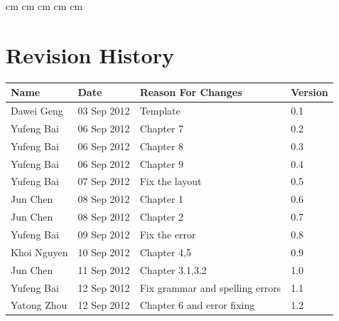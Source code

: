 \documentclass[11pt, a4paper]{report}
\begin{document}
 cm
 cm
 cm
 cm
 cm

\tableofcontents






\clearpage
\section*{Revision History}
\begin{tabular}{| l | l | l | l | }
\hline
Name				&	Date        	&	Reason For Changes                  	  	&	Version     	\\ \hline
Dawei Geng			&	03 Sep 2012     &	Template			                    	&	0.1 	    	\\ \hline
Yufeng Bai			&	06 Sep 2012	&	Chapter 7							&	0.2		\\ \hline
Yufeng Bai			&	06 Sep 2012	&	Chapter 8							&	0.3		\\ \hline
Yufeng Bai			&	06 Sep 2012	&	Chapter 9							&	0.4		\\ \hline
Yufeng Bai			&	07 Sep 2012	&	Fix the layout						&	0.5		\\ \hline
Jun Chen    		&  	08 Sep 2012 	&	Chapter 1                  		  	&	0.6     	\\ \hline
Jun Chen   		&	08 Sep 2012 	&	Chapter 2                 	  			&	0.7     	\\ \hline
Yufeng Bai			&	09 Sep 2012	&	Fix the error						&	0.8		\\ \hline
Khoi Nguyen 		&	10 Sep 2012     &	Chapter 4,5             				&	0.9     	\\ \hline
Jun Chen			&	11 Sep 2012	&	Chapter 3.1,3.2                	  		&	1.0    	\\\hline
Yufeng Bai			&	12 Sep 2012	&	Fix grammar and spelling errors			&	1.1		\\ \hline
Yatong Zhou      	&	12 Sep 2012     &	Chapter 6 and error fixing				&	1.2     	\\ \hline
%





\end{tabular}
\clearpage
\end{document}
